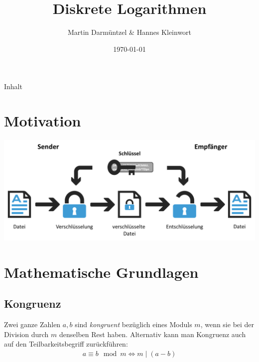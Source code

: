 \documentclass[utf8]{beamer}
\begin{document}
\title[]{Diskrete Logarithmen}
\author{Martin Darmüntzel \& Hannes Kleinwort}
\date{\today}

\begin{frame}
  \titlepage{}
\end{frame}

\begin{frame}[t]{Inhalt}
  \tableofcontents
\end{frame}

\section{Motivation}
\label{sec:motivation}

\begin{frame}{\insertsectionhead}
  \begin{center}
    \includegraphics[width=\textwidth]{verschluesselung.png}
  \end{center}
\end{frame}

\section{Mathematische Grundlagen}
\label{sec:mathematische_grundlagen}

\subsection{Kongruenz}
\label{sub:kongruenz}

\begin{frame}{\insertsubsectionhead}
  Zwei ganze Zahlen $a, b$ sind \emph{kongruent} bezüglich eines Moduls $m$,
  wenn sie bei der Division durch $m$ denselben Rest haben. Alternativ kann man
  Kongruenz auch auf den Teilbarkeitsbegriff zurückführen:
  \begin{align*}
    a \equiv b \mod m \Leftrightarrow m \mid (a - b)
  \end{align*}
\end{frame}
\end{document}
